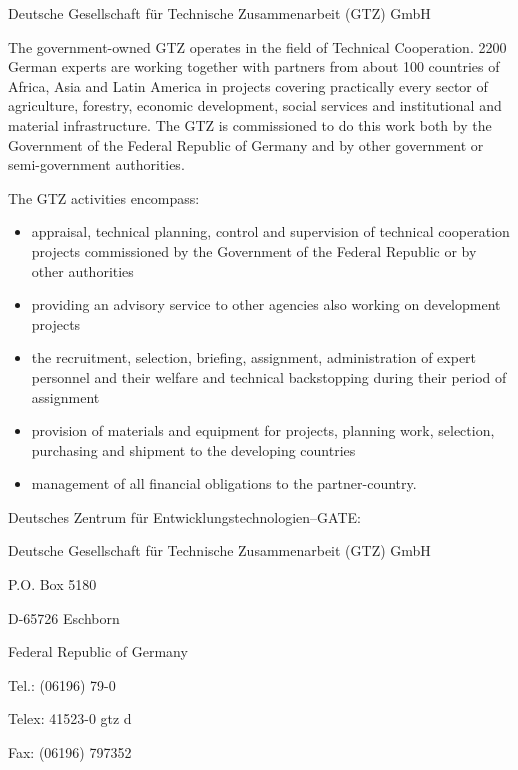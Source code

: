 Deutsche Gesellschaft f\"{u}r Technische Zusammenarbeit (GTZ) GmbH

The government-owned GTZ operates in the field of Technical Cooperation. 2200 
German experts are working together with partners from about 100 countries of 
Africa, Asia and Latin America in projects covering practically every sector of 
agriculture, forestry, economic development, social services and institutional 
and material infrastructure. The GTZ is commissioned to do this work both by 
the Government of the Federal Republic of Germany and by other government or 
semi-government authorities.

The GTZ activities encompass:
\begin{itemize}
\item appraisal, technical planning, control and supervision of technical 
cooperation projects commissioned by the Government of the Federal Republic or 
by other authorities

\item providing an advisory service to other agencies also working on 
development projects

\item the recruitment, selection, briefing, assignment, administration of 
expert personnel and their welfare and technical backstopping during their 
period of assignment

\item provision of materials and equipment for projects, planning work, 
selection, purchasing and shipment to the developing countries

\item management of all financial obligations to the partner-country.
\end{itemize}
Deutsches Zentrum f\"{u}r Entwicklungstechnologien--GATE:

Deutsche Gesellschaft f\"{u}r Technische Zusammenarbeit (GTZ) GmbH

P.O. Box 5180

D-65726 Eschborn

Federal Republic of Germany


Tel.: (06196) 79-0

Telex: 41523-0 gtz d

Fax: (06196) 797352

